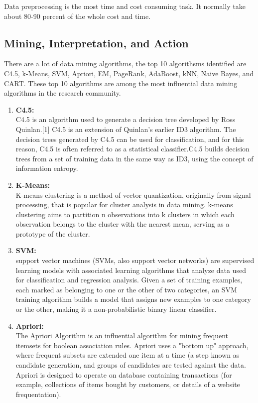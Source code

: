\documentclass[fleqn,10pt]{SelfArx} %
\begin{document}
Data preprocessing is the most time and cost consuming task. It normally take about 80-90 percent of the whole cost and time.

\subsection{Mining, Interpretation, and Action}
There are a lot of data mining algorithms, the top 10 algorithsms identified are C4.5, k-Means, SVM, Apriori, EM, PageRank, AdaBoost, kNN, Naive Bayes, and CART. These top 10 algorithms are among the most influential data mining algorithms in the research community.
\begin{enumerate}
\item \textbf{C4.5:}\\C4.5 is an algorithm used to generate a decision tree developed by Ross Quinlan.[1] C4.5 is an extension of Quinlan's earlier ID3 algorithm. The decision trees generated by C4.5 can be used for classification, and for this reason, C4.5 is often referred to as a statistical classifier.C4.5 builds decision trees from a set of training data in the same way as ID3, using the concept of information entropy.
\item \textbf{K-Means:}\\K-means clustering is a method of vector quantization, originally from signal processing, that is popular for cluster analysis in data mining. k-means clustering aims to partition n observations into k clusters in which each observation belongs to the cluster with the nearest mean, serving as a prototype of the cluster.
\item \textbf{SVM:}\\support vector machines (SVMs, also support vector networks) are supervised learning models with associated learning algorithms that analyze data used for classification and regression analysis. Given a set of training examples, each marked as belonging to one or the other of two categories, an SVM training algorithm builds a model that assigns new examples to one category or the other, making it a non-probabilistic binary linear classifier.
\item \textbf{Apriori:}\\The Apriori Algorithm is an influential algorithm for mining frequent itemsets for boolean association rules. Apriori uses a "bottom up" approach, where frequent subsets are extended one item at a time (a step known as candidate generation, and groups of candidates are tested against the data. Apriori is designed to operate on database containing transactions (for example, collections of items bought by customers, or details of a website frequentation).

\end{enumerate}
\end{document}
